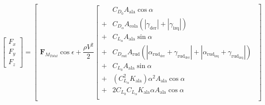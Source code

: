 \documentclass{article}
\begin{document}
\begin{equation*}
  \label{eq:fuerzas_totales_corregidas}
  \begin{bmatrix}
    F_x \\[6pt]
    F_y \\[6pt]
    F_z
  \end{bmatrix}
  = \begin{bmatrix}
      \mathbf{F}_{M_{Total}} \cos\epsilon + \dfrac{\rho V^2}{2} \left[ \begin{aligned}
                                                                           & C_{D_0} A_{\text{ala}} \cos\alpha                                                                                                                                                 \\
                                                                         + & C_{D_\alpha} A_{\text{cola}} (|\gamma_{\text{der}}| + |\gamma_{\text{izq}}|)                                                                                                      \\
                                                                         + & C_{L_\alpha} A_{\text{ala}} \sin\alpha                                                                                                                                            \\
                                                                         + & C_{D_{\text{rud}}} A_{\text{rud}} (|\alpha_{\text{rud}_{\text{der}}} + \gamma_{\text{rud}_{\text{der}}}| + |\alpha_{\text{rud}_{\text{izq}}} + \gamma_{\text{rud}_{\text{izq}}}|) \\
                                                                         + & C_{L_0} A_{\text{ala}} \sin\alpha                                                                                                                                                 \\
                                                                         + & (C_{L_\alpha}^2 K_{\text{ala}}) \alpha^2 A_{\text{ala}} \cos\alpha                                                                                                                \\
                                                                         + & 2 C_{L_0} C_{L_\alpha} K_{\text{ala}} \alpha A_{\text{ala}} \cos\alpha                                                                                                            \\

\end{aligned}
\end{bmatrix}
\end{equation*}
\end{document}
